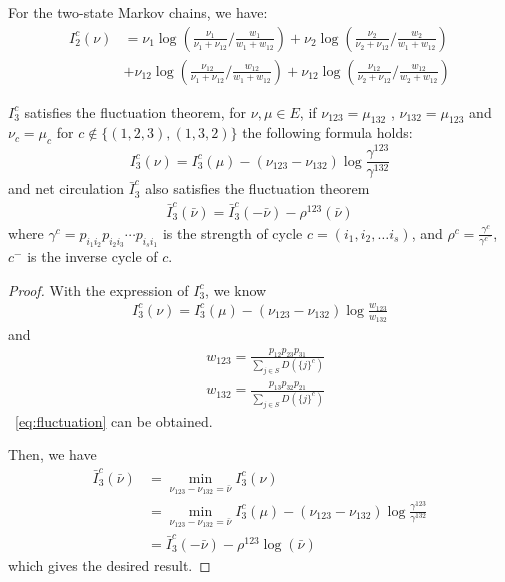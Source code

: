 \documentclass[11pt,en,cite=authoryear]{elegantpaper}
\begin{document}
\begin{corollary}
    For the two-state Markov chains, we have:
    \begin{align*}
    I_2^c(\nu) 
    &= \nu_{1}\log(\frac{\nu_{1}}{\nu_{1}+\nu_{12}}/\frac{w_{1}}{w_{1}+w_{12}}) 
    + \nu_{2} \log(\frac{\nu_{2}}{\nu_{2}+\nu_{12}}/\frac{w_{2}}{w_{1}+w_{12}}) \\
    &+ \nu_{12} \log (\frac{\nu_{12}}{\nu_{1}+\nu_{12}}/\frac{w_{12}}{w_{1}+w_{12}})
    + \nu_{12} \log (\frac{\nu_{12}}{\nu_{2}+\nu_{12}}/\frac{w_{12}}{w_{2}+w_{12}})
\end{align*}
\end{corollary}

\begin{corollary} \label{}
    $I_3^c$ satisfies the fluctuation theorem, for $\nu, \mu \in E$, if $\nu_{123} = \mu_{132}$ , $\nu_{132} = \mu_{123}$ and $\nu_c = \mu_c$ for $c \notin \{(1,2,3), (1,3,2)\}$ the following formula holds:
    \begin{equation} \label{eq:fluctuation}
        I_3^c(\nu) = I_3^c(\mu) - (\nu_{123} - \nu_{132}) \log \frac{\gamma^{123}}{\gamma^{132}}
    \end{equation}
    and net circulation $\bar{I}_3^c$ also satisfies the fluctuation theorem
    \begin{align*}
        \bar{I}_3^c (\bar{\nu}) = \bar{I}_3^c(-\bar{\nu}) - \rho^{123} (\bar{\nu})
    \end{align*}
    where $\gamma^c = p_{i_1 i_2} p_{i_2 i_3} \cdots p_{i_s i_1}$ is the strength of cycle $c=(i_1, i_2, \dots i_s)$, and $\rho^{c} = \frac{\gamma^{c}}{\gamma^{c^-}} $, $c^-$ is the inverse cycle of $c$.
\end{corollary}
\begin{proof}
    With the expression of $I_3^c$, we know
    \begin{align*}
        I_3^c(\nu) = I_3^c(\mu) - (\nu_{123} - \nu_{132}) \log \frac{w_{123}}{w_{132}}
    \end{align*}
    and
    \begin{align*}
        &w_{123} = \frac{p_{12} p_{23} p_{31}}{\sum_{j\in S} D(\{j\}^c)} \\
        &w_{132} = \frac{p_{13} p_{32} p_{21}}{\sum_{j\in S} D(\{j\}^c)}
    \end{align*}
    ~\ref{eq:fluctuation} can be obtained.

    Then, we have
    \begin{align*}
        \bar{I}_3^c (\bar{\nu}) 
        &= \min_{\nu_{123} -\nu_{132}=\bar{\nu}} I_3^c(\nu) \\
        &= \min_{\nu_{123} -\nu_{132}=\bar{\nu}} I_3^c(\mu) - (\nu_{123} - \nu_{132}) \log \frac{\gamma^{123}}{\gamma^{132}} \\
        &=\bar{I}_3^c(-\bar{\nu}) - \rho^{123} \log (\bar{\nu})
    \end{align*}
    which gives the desired result.
\end{proof}
\end{document}
